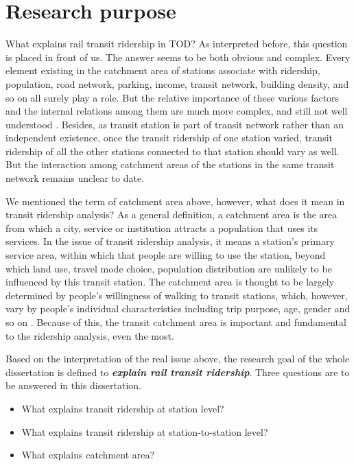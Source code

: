 % 
\section{Research purpose}
What explains rail transit ridership in TOD? As interpreted before, this question is placed in front of us. The answer seems to be both obvious and complex. Every element existing in the catchment area of stations associate with ridership, population, road network, parking, income, transit network, building density, and so on all surely play a role. But the relative importance of these various factors and the internal relations among them are much more complex, and still not well understood \cite{taylor2003factors}. Besides, as transit station is part of transit network rather than an independent existence, once the transit ridership of one station varied, transit ridership of all the other stations connected to that station should vary as well. But the interaction among catchment areas of the stations in the same transit network remains unclear to date.

We mentioned the term of catchment area above, however, what does it mean in transit ridership analysis? As a general definition, a catchment area is the area from which a city, service or institution attracts a population that uses its services. In the issue of transit ridership analysis, it means a station's primary service area, within which that people are willing to use the station, beyond which land use, travel mode choice, population distribution are unlikely to be influenced by this transit station. The catchment area is thought to be largely determined by people's willingness of walking to transit stations, which, however, vary by people's individual characteristics including trip purpose, age, gender and so on \cite{guerra2013half}. Because of this, the transit catchment area is important and fundamental to the ridership analysis, even the most.

Based on the interpretation of the real issue above, the research goal of the whole dissertation is defined to \emph{\textbf{explain rail transit ridership}}. Three questions are to be answered in this dissertation.

\begin{itemize}
	\item What explains transit ridership at station level?
	\item What explains transit ridership at station-to-station level?
	\item What explains catchment area?
\end{itemize}

